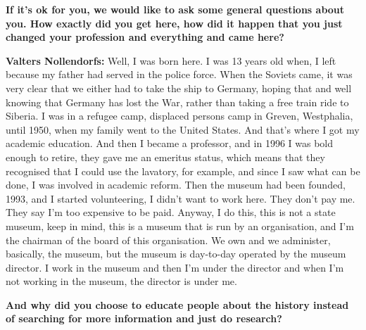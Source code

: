 \textbf{If it's ok for you, we would like to ask some general questions about you. How exactly did you get here, how did it happen that you just changed your profession and everything and came here?}

\textbf{Valters Nollendorfs:} Well, I was born here. I was 13 years old when, I left because my father had served in the police force. When the Soviets came, it was very clear that we either had to take the ship to Germany, hoping that and well knowing that Germany has lost the War, rather than taking a free train ride to Siberia. I was in a refugee camp, displaced persons camp in Greven, Westphalia, until 1950, when my family went to the United States. And that's where I got my academic education. And then I became a professor, and in 1996 I was bold enough to retire, they gave me an emeritus status, which means that they recognised that I could use the lavatory, for example, and since I saw what can be done, I was involved in academic reform. Then the museum had been founded, 1993, and I started volunteering, I didn't want to work here. They don't pay me. 
They say I’m too expensive to be paid. Anyway, I do this, this is not a state museum, keep in mind, this is a museum that is run by an organisation, and I'm the chairman of the board of this organisation. We own and we administer, basically, the museum, but the museum is day-to-day operated by the museum director. I work in the museum and then I'm under the director and when I'm not working in the museum, the director is under me.

\textbf{And why did you choose to educate people about the history instead of searching for more information and just do research?}

